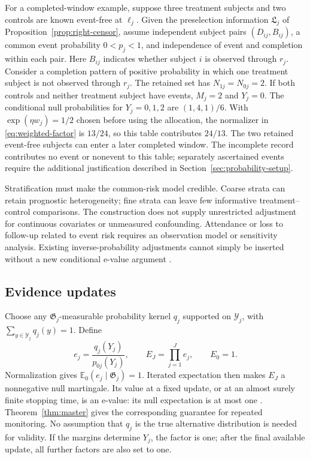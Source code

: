 \documentclass[12pt]{article}
\theoremstyle{definition}
\theoremstyle{remark}
\begin{document}
For a completed-window example, suppose three treatment subjects and two controls are known event-free at $\ell_j$. Given the preselection information $\mathfrak L_j$ of Proposition~\ref{prop:right-censor}, assume independent subject pairs $(D_{ij},B_{ij})$, a common event probability $0<p_j<1$, and independence of event and completion within each pair. Here $B_{ij}$ indicates whether subject $i$ is observed through $r_j$. Consider a completion pattern of positive probability in which one treatment subject is not observed through $r_j$. The retained set has $N_{1j}=N_{0j}=2$. If both controls and neither treatment subject have events, $M_j=2$ and $Y_j=0$. The conditional null probabilities for $Y_j=0,1,2$ are $(1,4,1)/6$. With $\exp(\eta w_j)=1/2$ chosen before using the allocation, the normalizer in \eqref{eq:weighted-factor} is $13/24$, so this table contributes $24/13$. The two retained event-free subjects can enter a later completed window. The incomplete record contributes no event or nonevent to this table; separately ascertained events require the additional justification described in Section~\ref{sec:probability-setup}.

Stratification must make the common-risk model credible. Coarse strata can retain prognostic heterogeneity; fine strata can leave few informative treatment--control comparisons. The construction does not supply unrestricted adjustment for continuous covariates or unmeasured confounding. Attendance or loss to follow-up related to event risk requires an observation model or sensitivity analysis. Existing inverse-probability adjustments cannot simply be inserted without a new conditional e-value argument \citep{HeitjanRubin1991,GillVanDerLaanRobins1997,RobinsFinkelstein2000}.

\subsection{Evidence updates}

Choose any $\mathfrak G_j$-measurable probability kernel $q_j$ supported on $\mathcal Y_j$, with $\sum_{y\in\mathcal Y_j}q_j(y)=1$. Define
\begin{equation}
 e_j=\frac{q_j(Y_j)}{p_{0j}(Y_j)},
 \qquad E_J=\prod_{j=1}^J e_j,\qquad E_0=1.
 \label{eq:generic-eprocess}
\end{equation}
Normalization gives $\mathbb E_0(e_j\mid\mathfrak G_j)=1$. Iterated expectation then makes $E_J$ a nonnegative null martingale. Its value at a fixed update, or at an almost surely finite stopping time, is an e-value: its null expectation is at most one \citep{VovkWang2021,RamdasWang2025}. Theorem~\ref{thm:master} gives the corresponding guarantee for repeated monitoring. No assumption that $q_j$ is the true alternative distribution is needed for validity. If the margins determine $Y_j$, the factor is one; after the final available update, all further factors are also set to one.
\end{document}
